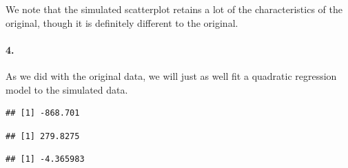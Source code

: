 \documentclass[
]{article}
\newenvironment{Shaded}{\begin{snugshade}}{\end{snugshade}}
\newcommand{\DecValTok}[1]{\textcolor[rgb]{0.00,0.00,0.81}{#1}}
\newcommand{\KeywordTok}[1]{\textcolor[rgb]{0.13,0.29,0.53}{\textbf{#1}}}
\newcommand{\NormalTok}[1]{#1}
\newcommand{\OperatorTok}[1]{\textcolor[rgb]{0.81,0.36,0.00}{\textbf{#1}}}
\newcommand{\StringTok}[1]{\textcolor[rgb]{0.31,0.60,0.02}{#1}}
\begin{document}
We note that the simulated scatterplot retains a lot of the
characteristics of the original, though it is definitely different to
the original.

\hypertarget{section-53}{%
\paragraph{\texorpdfstring{\textbf{4.}}{4.}}\label{section-53}}

As we did with the original data, we will just as well fit a quadratic
regression model to the simulated data.

\begin{Shaded}
\end{Shaded}

\begin{verbatim}
## [1] -868.701
\end{verbatim}

\begin{Shaded}
\end{Shaded}

\begin{verbatim}
## [1] 279.8275
\end{verbatim}

\begin{Shaded}
\end{Shaded}

\begin{verbatim}
## [1] -4.365983
\end{verbatim}

\begin{Shaded}
\end{Shaded}
\end{document}
